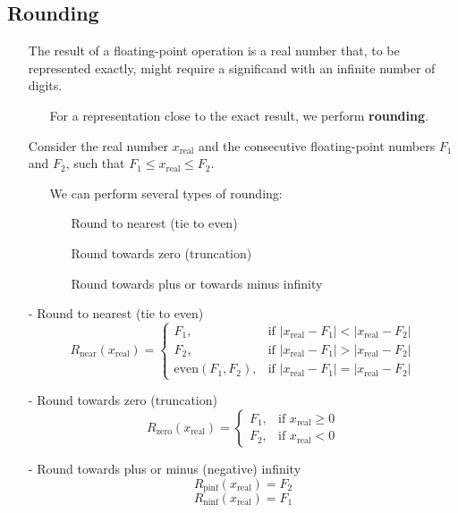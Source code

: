 \documentclass[12pt,openany, tikz,border=10pt]{book}
\begin{document}
\subsection{Rounding}
\begin{itemize}
    \item[] The result of a floating-point operation is a real number that, to be represented exactly, might require a significand with an infinite number of digits.
    \begin{itemize}
        \item[] For a representation close to the exact result, we perform \textbf{rounding}.
    \end{itemize}
    \item[] Consider the real number \( x_{\text{real}} \) and the consecutive floating-point numbers \( F_1 \) and \( F_2 \), such that \( F_1 \leq x_{\text{real}} \leq F_2 \).
    \begin{itemize}
        \item[] We can perform several types of rounding:
        \begin{itemize}
            \item[] Round to nearest (tie to even)
            \item[] Round towards zero (truncation)
            \item[] Round towards plus or towards minus infinity
        \end{itemize}
    \end{itemize}
\end{itemize}
\begin{itemize}
    \item[-] Round to nearest (tie to even)
    \[ R_{\text{near}}(x_{\text{real}}) = 
    \begin{cases} 
    F_1, & \text{if } |x_{\text{real}} - F_1| < |x_{\text{real}} - F_2| \\
    F_2, & \text{if } |x_{\text{real}} - F_1| > |x_{\text{real}} - F_2| \\
    \text{even}(F_1, F_2), & \text{if } |x_{\text{real}} - F_1| = |x_{\text{real}} - F_2|
    \end{cases}
    \]
    
    \item[-] Round towards zero (truncation)
    \[ R_{\text{zero}}(x_{\text{real}}) = 
    \begin{cases} 
    F_1, & \text{if } x_{\text{real}} \geq 0 \\
    F_2, & \text{if } x_{\text{real}} < 0
    \end{cases}
    \]
    
    \item[-] Round towards plus or minus (negative) infinity
    \[ R_{\text{pinf}}(x_{\text{real}}) = F_2 \]
    \[ R_{\text{ninf}}(x_{\text{real}}) = F_1 \]
\end{itemize}
\end{document}
